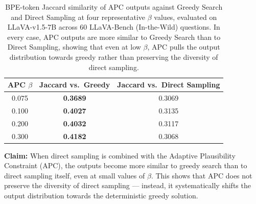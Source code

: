 \documentclass[11pt]{article}
\begin{document}
\begin{table}[ht]
\centering
\caption{BPE-token Jaccard similarity of APC outputs against Greedy Search and Direct Sampling
at four representative $\beta$ values, evaluated on LLaVA-v1.5-7B across 60 LLaVA-Bench
(In-the-Wild) questions. In every case, APC outputs are more similar to Greedy Search than to
Direct Sampling, showing that even at low $\beta$, APC pulls the output distribution towards
greedy rather than preserving the diversity of direct sampling.}
\label{tab:jaccard_apc_greedy_vs_sample}

\setlength{\tabcolsep}{12pt}
\renewcommand{\arraystretch}{1.2}

\begin{tabular}{ccc}
\toprule
\textbf{APC $\beta$}
  & \textbf{Jaccard vs.\ Greedy}
  & \textbf{Jaccard vs.\ Direct Sampling} \\
\midrule
0.075 & \textbf{0.3689} & 0.3069 \\
0.100 & \textbf{0.4027} & 0.3135 \\
0.200 & \textbf{0.4032} & 0.3117 \\
0.300 & \textbf{0.4182} & 0.3068 \\
\bottomrule
\end{tabular}

\medskip
\noindent
\textbf{Claim:} When direct sampling is combined with the Adaptive Plausibility Constraint
(APC), the outputs become more similar to greedy search than to direct sampling itself,
even at small values of $\beta$. This shows that APC does not preserve the diversity of
direct sampling --- instead, it systematically shifts the output distribution towards the
deterministic greedy solution.

\end{table}

\bigskip
\end{document}
